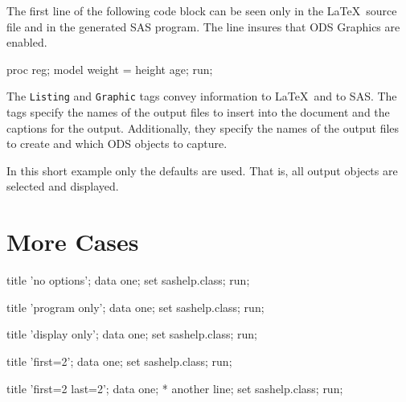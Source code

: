 \documentclass[a4paper]{article}
\begin{document}
The first line of the following code block can be seen only
in the \LaTeX\ source file and in the generated SAS program. 
The line insures that ODS Graphics are enabled.

\begin{Sascode}[store=REGa]
	proc reg;
	model weight = height age;
	run;
\end{Sascode}

The \texttt{Listing} and \texttt{Graphic} tags convey information to
\LaTeX\ and to SAS. The tags specify the names of the output files to
insert into the document and the captions for the output.
Additionally, they specify the names of the output files to create
and which ODS objects to capture.



In this short example only the defaults are used. That is, all output
objects are selected and displayed.



\section{More Cases}
\begin{Datastep}
title 'no options';
data one;
  set sashelp.class;
run;
\end{Datastep}

\begin{Datastep}[program]
title 'program only';
data one;
  set sashelp.class;
run;
\end{Datastep}

\begin{Datastep}[display]
title 'display only';
data one;
  set sashelp.class;
run;
\end{Datastep}

\begin{Datastep}[first=2]
title 'first=2';
data one;
  set sashelp.class;
run;
\end{Datastep}

\begin{Datastep}[first=2, last=2]
title 'first=2 last=2';
data one;
  * another line;
  set sashelp.class;
run;
\end{Datastep}
\end{document}
